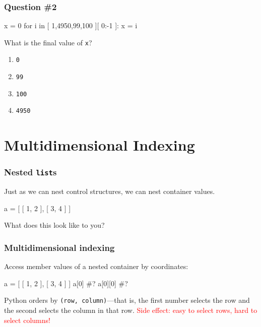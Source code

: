 \documentclass[11pt]{beamer}
\begin{document}
\begin{frame}[fragile]
\frametitle{Question \#2}
\Enlarge

\begin{semiverbatim}
x = 0
for i in [ 1,4950,99,100 ][ 0:-1 ]:
    x = i
\end{semiverbatim}
  What is the final value of \texttt{x}?
  \begin{enumerate}[label=\Alph*]
  \item  \texttt{0}
  \item  \texttt{99}
  \item  \texttt{100}
  \item  \texttt{4950}
  \end{enumerate}
\end{frame}

\section{Multidimensional Indexing}

\begin{frame}[fragile]
  \frametitle{Nested \texttt{list}s}
  \Enlarge

  \begin{itemize}
  \myitem  Just as we can nest control structures, we can nest container values. \pause
  \end{itemize}
  \begin{semiverbatim}
a = [ [ 1, 2 ], [ 3, 4 ] ]
  \end{semiverbatim}
  \begin{itemize}
  \myitem  What does this look like to you?
  \end{itemize}
\end{frame}

\begin{frame}[fragile]
  \frametitle{Multidimensional indexing}
  \Enlarge

  \begin{itemize}
  \myitem  Access member values of a nested container by coordinates: \pause
  \end{itemize}
  \begin{semiverbatim}
a = [ [ 1, 2 ], [ 3, 4 ] ]
a[0]    #?
a[0][0] #?
  \end{semiverbatim} \pause
  \begin{itemize}
  \myitem  Python orders by \texttt{(row, column)}---that is, the first number selects the row and the second selects the column in that row. \pause
  \myitem  \textcolor{red}{Side effect:  easy to select rows, hard to select columns!}
  \end{itemize}
\end{frame}
\end{document}
